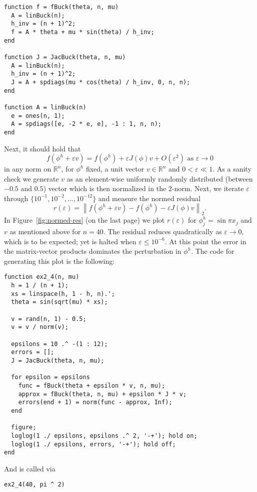 \documentclass[a4paper]{article}
\newcommand{\norm}[1]{\left\lVert#1\right\rVert}
\begin{document}
  \begin{lstlisting}
function f = fBuck(theta, n, mu)
  A = linBuck(n);
  h_inv = (n + 1)^2;
  f = A * theta + mu * sin(theta) / h_inv;
end

function J = JacBuck(theta, n, mu)
  A = linBuck(n);
  h_inv = (n + 1)^2;
  J = A + spdiags(mu * cos(theta) / h_inv, 0, n, n);
end

function A = linBuck(n)
  e = ones(n, 1);
  A = spdiags([e, -2 * e, e], -1 : 1, n, n);
end
  \end{lstlisting}
  Next, it should hold that $$f(\phi^h + \varepsilon v) = f(\phi^h) + \varepsilon J(\phi)v + O(\varepsilon^2) \text{ as } \varepsilon \to 0$$ in any norm on $\mathbb{R}^n$, for $\phi^h$ fixed, a unit vector $v \in \mathbb{R}^n$ and $0 < \varepsilon \ll 1.$ As a sanity check we generate $v$ as an element-wise uniformly randomly distributed (between $-0.5$ and $0.5$) vector which is then normalized in the 2-norm. Next, we iterate $\varepsilon$ through $\{10^{-1}, 10^{-2}, \dots, 10^{-12}\}$ and measure the normed residual 
  \begin{equation}\label{eq:normed-res}
    r(\varepsilon) = \norm{f(\phi^h + \varepsilon v) - f(\phi^h) - \varepsilon J(\phi)v}_2.
  \end{equation} 
  In Figure~\ref{fig:normed-res} (on the last page) we plot $r(\varepsilon)$ for $\phi^h_j = \sin \pi x_j$ and $v$ as mentioned above for $n = 40$. The residual reduces quadratically as $\varepsilon \to 0,$ which is to be expected; yet is halted when $\varepsilon \le 10^{-6}.$ At this point the error in the matrix-vector products dominates the perturbation in $\phi^h.$ The code for generating this plot is the following:
  \newpage
\begin{lstlisting}
function ex2_4(n, mu)
  h = 1 / (n + 1);
  xs = linspace(h, 1 - h, n).';
  theta = sin(sqrt(mu) * xs);

  v = rand(n, 1) - 0.5;
  v = v / norm(v);

  epsilons = 10 .^ -(1 : 12);
  errors = [];
  J = JacBuck(theta, n, mu);

  for epsilon = epsilons
    func = fBuck(theta + epsilon * v, n, mu);
    approx = fBuck(theta, n, mu) + epsilon * J * v;
    errors(end + 1) = norm(func - approx, Inf);
  end

  figure;
  loglog(1 ./ epsilons, epsilons .^ 2, '-+'); hold on;
  loglog(1 ./ epsilons, errors, '-+'); hold off;
end
\end{lstlisting}
  And is called via
  \begin{lstlisting}
ex2_4(40, pi ^ 2)
  \end{lstlisting}
\end{document}

